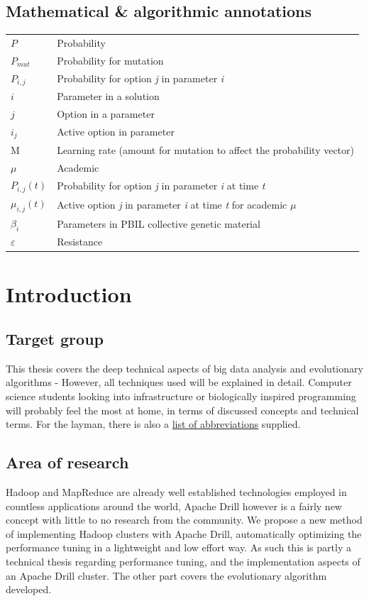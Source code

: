 \documentclass[a4paper,english]{report}
\begin{document}
	\section{Mathematical \& algorithmic annotations}
	\label{table:annotations}
	\begin{table}[h]
		\centering
		\begin{tabular}{ll}
			$P$	& Probability \\
			$P_{mut}$	& Probability for mutation \\
			$P_{i,j}$	& Probability for option \textit{j} in parameter \textit{i} \\
			$i$  & Parameter in a solution \\
			$j$ & Option in a parameter \\
			$i_{j}$ & Active option in parameter \\
			M & Learning rate (amount for mutation to affect the probability vector) \\
			$\mu$ & Academic \\
			$P_{i,j}(t)$ & Probability for option \textit{j} in parameter \textit{i} at time \textit{t} \\
			$\mu_{i,j}(t)$ & Active option \textit{j} in parameter \textit{i} at time \textit{t} for academic $\mu$ \\
			$\beta_{i}$ & Parameters in PBIL collective genetic material \\
			$\varepsilon$ & Resistance
			
		\end{tabular}
	\end{table}

	
	\chapter{Introduction}
		
		\section{Target group}
		This thesis covers the deep technical aspects of big data analysis and evolutionary algorithms - However, all techniques used will be explained in detail. Computer science students looking into infrastructure or biologically inspired programming will probably feel the most at home, in terms of discussed concepts and technical terms. For the layman, there is also a \hyperref[word_list]{list of abbreviations} supplied.
		
		\section{Area of research}
		Hadoop and MapReduce are already well established technologies employed in countless applications around the world, Apache Drill however is a fairly new concept with little to no research from the community. We propose a new method of implementing Hadoop clusters with Apache Drill, automatically optimizing the performance tuning in a lightweight and low effort way. As such this is partly a technical thesis regarding performance tuning, and the implementation aspects of an Apache Drill cluster. The other part covers the evolutionary algorithm developed.
		
\end{document}
